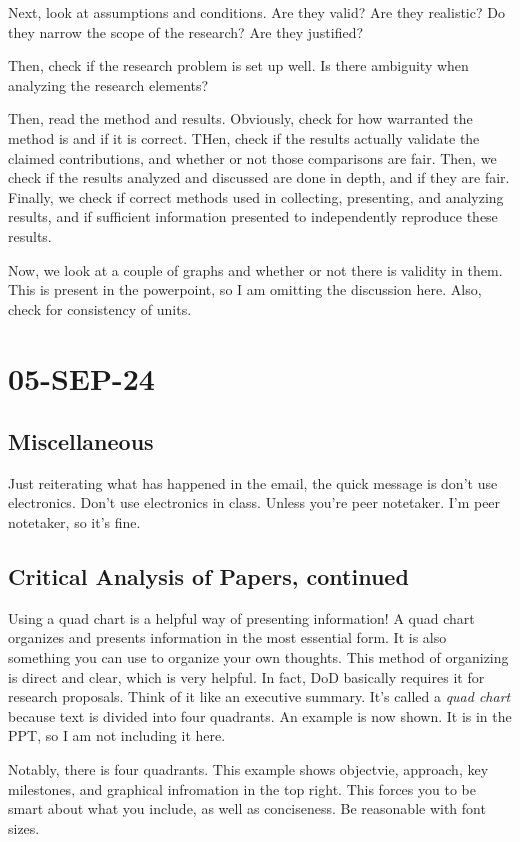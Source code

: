 \documentclass[10pt, oneside]{article}
\begin{document}
Next, look at assumptions and conditions. Are they valid? Are they realistic? Do they narrow the scope of the research? Are they justified?

Then, check if the research problem is set up well. Is there ambiguity when analyzing the research elements?

Then, read the method and results. Obviously, check for how warranted the method is and if it is correct. THen, check if the results actually validate the claimed contributions, and whether or not those comparisons are fair. Then, we check if the results analyzed and discussed are done in depth, and if they are fair. Finally, we check if correct methods used in collecting, presenting, and analyzing results, and if sufficient information presented to independently reproduce these results. 

Now, we look at a couple of graphs and whether or not there is validity in them. This is present in the powerpoint, so I am omitting the discussion here. Also, check for consistency of units. 

\section{05-SEP-24}
\subsection{Miscellaneous}
Just reiterating what has happened in the email, the quick message is don't use electronics. Don't use electronics in class. Unless you're peer notetaker. I'm peer notetaker, so it's fine. 
\subsection{Critical Analysis of Papers, continued}
Using a quad chart is a helpful way of presenting information! A quad chart organizes and presents information in the most essential form. It is also something you can use to organize your own thoughts. This method of organizing is direct and clear, which is very helpful. In fact, DoD basically requires it for research proposals. Think of it like an executive summary. 
It's called a \textit{quad chart} because text is divided into four quadrants. An example is now shown. It is in the PPT, so I am not including it here. 

Notably, there is four quadrants. This example shows objectvie, approach, key milestones, and graphical infromation in the top right. This forces you to be smart about what you include, as well as conciseness. Be reasonable with font sizes. 
\end{document}
